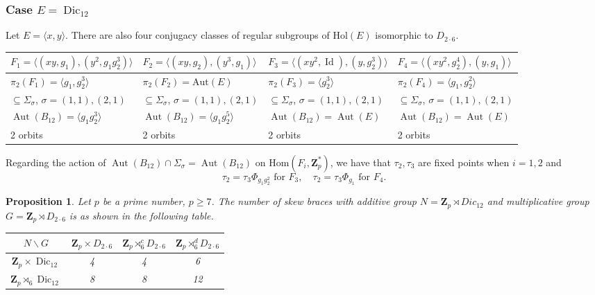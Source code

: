 \documentclass[12pt]{article}
\newtheorem{proposition}[theorem]{Proposition}
\theoremstyle{definition}
\newcommand{\Z}{\mathbf Z}
\newcommand{\Hom}{\mathrm{Hom}}
\newcommand{\Aut}{\operatorname{Aut}}
\newcommand{\Id}{\operatorname{Id}}
\newcommand{\Dic}{\operatorname{Dic}}
\begin{document}
\subsubsection*{Case $E=\Dic_{12}$}

Let $E=\langle x,y\rangle$. There are also  four conjugacy classes of regular subgroups of $\mathrm{Hol}(E)$ isomorphic to $D_{2\cdot6}$. 

\begin{center}
    \begin{tabular}{|l|l|l|l|}
    
    \hline
       $F_1=\langle (xy,g_1),(y^2,g_1g_2^3)\rangle$ &
     $ F_2=\langle (xy,g_2),(y^3,g_1)\rangle$&
      $F_3=\langle (xy^2,\Id),(y,g_2^3)\rangle$&
      $F_4=\langle (xy^2,g_2^4),(y,g_1)\rangle$\\
      \hline
      $\pi_2(F_1)=\langle g_1,g_2^3\rangle$ &
      $\pi_2(F_2)=\mathrm{Aut}(E)$ &
      $\pi_2(F_3)=\langle g_2^3\rangle$&
      $\pi_2(F_4)=\langle g_1,g_2^2\rangle$\\
      $\subseteq \Sigma_{\sigma}$,  $\sigma=(1,1),(2,1)$ & 
      $\subseteq \Sigma_{\sigma}$,  $\sigma=(1,1),(2,1)$ &
      $\subseteq \Sigma_{\sigma}$,  $\sigma=(1,1),(2,1)$ &
      $\subseteq \Sigma_{\sigma}$,  $\sigma=(1,1),(2,1)$
       \\
       $\Aut(B_{12})= \langle g_1g_2^3\rangle$&
       $\Aut(B_{12})=\langle g_1g_2^5\rangle$ &$\Aut(B_{12})= \Aut(E)$&
       $\Aut(B_{12})=\Aut(E)$\\
       2 orbits & 2 orbits & 2 orbits & 2 orbits\\
      \hline
    \end{tabular}
\end{center}    

Regarding the action of $\Aut(B_{12})\cap \Sigma_{\sigma}=\Aut(B_{12})$ on $\Hom(F_i,\Z_p^*)$, we have that $\tau_2,\tau_3$ are fixed points when $i=1,2$ and 
$$
\tau_2=\tau_3\Phi_{g_1g_2^2} \mbox{ for } F_3, \quad
\tau_2=\tau_3\Phi_{g_1} \mbox{ for } F_4.
$$


\begin{proposition}
	Let $p$ be a prime number, $p\geq 7$.
	The number of skew braces with additive group $N=\Z_p\rtimes Dic_{12}$ and multiplicative group $G=\Z_p\rtimes D_{2\cdot 6}$ is as shown in the following table.
	
	\begin{center}
		\begin{tabular}{|c||c|c|c|}
			\hline
			$N \backslash G$ & $\Z_p\times D_{2\cdot 6}$ & $\Z_p\rtimes_6^c D_{2\cdot 6} $ & $\Z_p\rtimes_6^d D_{2\cdot 6}$ \\
			\hline
			\hline
			$\Z_p\times \Dic_{12}$ & 4 & 4 & 6 \\ \hline $\Z_p\rtimes_6 \Dic_{12} $ & 8 & 8 & 12 \\ \hline 
		\end{tabular}
	\end{center}
\end{proposition}
\end{document}

